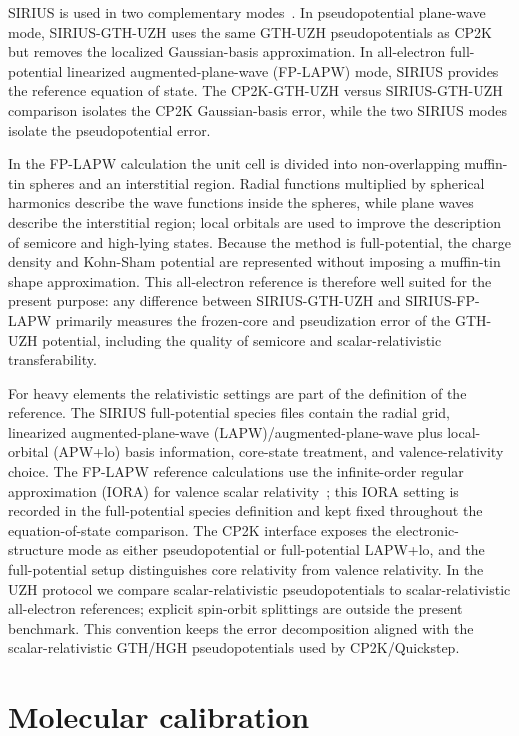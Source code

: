 \documentclass[aps,prb,preprint,amsmath,amssymb,superscriptaddress,longbibliography,floatfix]{revtex4-2}
\begin{document}
SIRIUS is used in two complementary modes~\cite{Zhang2022Computation,Zhang2023Sirius,SiriusDocs}. In pseudopotential plane-wave mode, SIRIUS-GTH-UZH uses the same GTH-UZH pseudopotentials as CP2K but removes the localized Gaussian-basis approximation. In all-electron full-potential linearized augmented-plane-wave (FP-LAPW) mode, SIRIUS provides the reference equation of state. The CP2K-GTH-UZH versus SIRIUS-GTH-UZH comparison isolates the CP2K Gaussian-basis error, while the two SIRIUS modes isolate the pseudopotential error.

In the FP-LAPW calculation the unit cell is divided into non-overlapping muffin-tin spheres and an interstitial region. Radial functions multiplied by spherical harmonics describe the wave functions inside the spheres, while plane waves describe the interstitial region; local orbitals are used to improve the description of semicore and high-lying states. Because the method is full-potential, the charge density and Kohn-Sham potential are represented without imposing a muffin-tin shape approximation. This all-electron reference is therefore well suited for the present purpose: any difference between SIRIUS-GTH-UZH and SIRIUS-FP-LAPW primarily measures the frozen-core and pseudization error of the GTH-UZH potential, including the quality of semicore and scalar-relativistic transferability.

For heavy elements the relativistic settings are part of the definition of the reference. The SIRIUS full-potential species files contain the radial grid, linearized augmented-plane-wave (LAPW)/augmented-plane-wave plus local-orbital (APW+lo) basis information, core-state treatment, and valence-relativity choice. The FP-LAPW reference calculations use the infinite-order regular approximation (IORA) for valence scalar relativity~\cite{Dyall1999IORA}; this IORA setting is recorded in the full-potential species definition and kept fixed throughout the equation-of-state comparison. The CP2K interface exposes the electronic-structure mode as either pseudopotential or full-potential LAPW+lo, and the full-potential setup distinguishes core relativity from valence relativity. In the UZH protocol we compare scalar-relativistic pseudopotentials to scalar-relativistic all-electron references; explicit spin-orbit splittings are outside the present benchmark. This convention keeps the error decomposition aligned with the scalar-relativistic GTH/HGH pseudopotentials used by CP2K/Quickstep.

\section{Molecular calibration}
\end{document}
